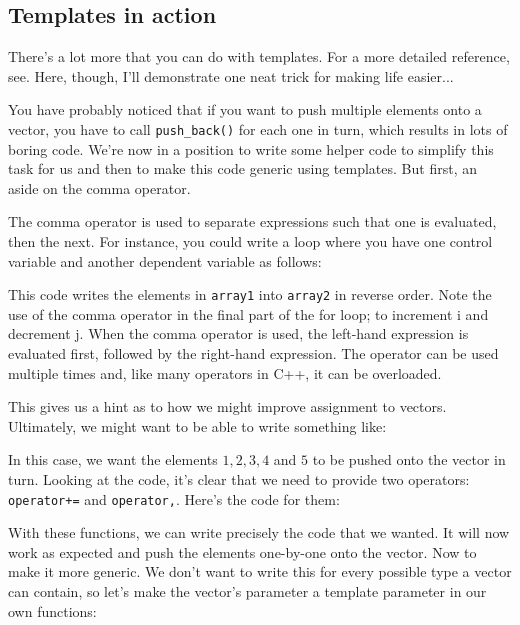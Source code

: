 \documentclass[a4paper]{scrartcl}
\begin{document}
\subsection{Templates in action}
There's a lot more that you can do with templates. For a more detailed reference, see\cite{Templates}. Here, though, I'll demonstrate one neat trick for making life easier...

You have probably noticed that if you want to push multiple elements onto a vector, you have to call \verb|push_back()| for each one in turn, which results in lots of boring code. We're now in a position to write some helper code to simplify this task for us and then to make this code generic using templates. But first, an aside on the comma operator.

The comma operator is used to separate expressions such that one is evaluated, then the next. For instance, you could write a loop where you have one control variable and another dependent variable as follows:



This code writes the elements in \verb|array1| into \verb|array2| in reverse order. Note the use of the comma operator in the final part of the for loop; to increment i and decrement j. When the comma operator is used, the left-hand expression is evaluated first, followed by the right-hand expression. The operator can be used multiple times and, like many operators in C++, it can be overloaded.

This gives us a hint as to how we might improve assignment to vectors. Ultimately, we might want to be able to write something like:



In this case, we want the elements $1, 2, 3, 4$ and $5$ to be pushed onto the vector in turn. Looking at the code, it's clear that we need to provide two operators: \verb|operator+=| and \verb|operator,|. Here's the code for them:



With these functions, we can write precisely the code that we wanted. It will now work as expected and push the elements one-by-one onto the vector. Now to make it more generic. We don't want to write this for every possible type a vector can contain, so let's make the vector's parameter a template parameter in our own functions:


\end{document}
